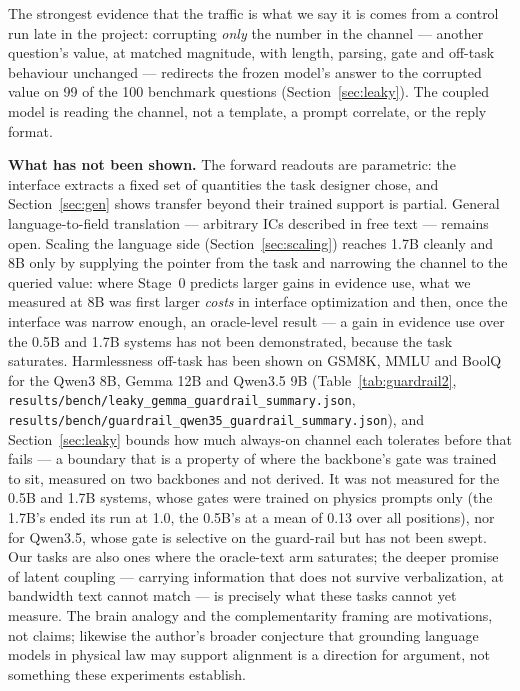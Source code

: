 \documentclass[11pt]{article}
\newcommand{\code}[1]{\texttt{#1}}
\begin{document}
The strongest evidence that the traffic is what we say it is comes from a control run late in the project: corrupting \emph{only} the number in the channel --- another question's value, at matched magnitude, with length, parsing, gate and off-task behaviour unchanged --- redirects the frozen model's answer to the corrupted value on 99 of the 100 benchmark questions (Section~\ref{sec:leaky}). The coupled model is reading the channel, not a template, a prompt correlate, or the reply format.

\textbf{What has not been shown.} The forward readouts are parametric: the interface extracts a fixed set of quantities the task designer chose, and Section~\ref{sec:gen} shows transfer beyond their trained support is partial. General language-to-field translation --- arbitrary ICs described in free text --- remains open. Scaling the language side (Section~\ref{sec:scaling}) reaches 1.7B cleanly and 8B only by supplying the pointer from the task and narrowing the channel to the queried value: where Stage~0 predicts larger gains in evidence use, what we measured at 8B was first larger \emph{costs} in interface optimization and then, once the interface was narrow enough, an oracle-level result --- a gain in evidence use over the 0.5B and 1.7B systems has not been demonstrated, because the task saturates. Harmlessness off-task has been shown on GSM8K, MMLU and BoolQ for the Qwen3 8B, Gemma 12B and Qwen3.5 9B (Table~\ref{tab:guardrail2}, \code{results/bench/leaky\_gemma\_guardrail\_summary.json}, \code{results/bench/guardrail\_qwen35\_guardrail\_summary.json}), and Section~\ref{sec:leaky} bounds how much always-on channel each tolerates before that fails --- a boundary that is a property of where the backbone's gate was trained to sit, measured on two backbones and not derived. It was not measured for the 0.5B and 1.7B systems, whose gates were trained on physics prompts only (the 1.7B's ended its run at 1.0, the 0.5B's at a mean of 0.13 over all positions), nor for Qwen3.5, whose gate is selective on the guard-rail but has not been swept. Our tasks are also ones where the oracle-text arm saturates; the deeper promise of latent coupling --- carrying information that does not survive verbalization, at bandwidth text cannot match --- is precisely what these tasks cannot yet measure. The brain analogy and the complementarity framing are motivations, not claims; likewise the author's broader conjecture that grounding language models in physical law may support alignment is a direction for argument, not something these experiments establish.
\end{document}
